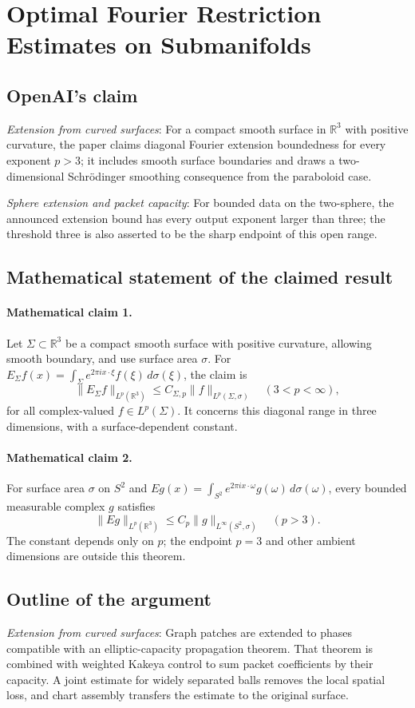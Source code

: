 \documentclass[11pt]{article}
\begin{document}
\section*{Optimal Fourier Restriction Estimates on Submanifolds}

\subsection{OpenAI's claim}
\textit{Extension from curved surfaces}: For a compact smooth surface in $\mathbb R^3$ with positive curvature, the paper claims diagonal Fourier extension boundedness for every exponent $p>3$; it includes smooth surface boundaries and draws a two-dimensional Schrödinger smoothing consequence from the paraboloid case.

\textit{Sphere extension and packet capacity}: For bounded data on the two-sphere, the announced extension bound has every output exponent larger than three; the threshold three is also asserted to be the sharp endpoint of this open range.

\subsection{Mathematical statement of the claimed result}
\paragraph{Mathematical claim 1.} Let $\Sigma\subset\mathbb R^3$ be a compact smooth surface with positive curvature, allowing smooth boundary, and use surface area $\sigma$. For $E_\Sigma f(x)=\int_\Sigma e^{2\pi ix\cdot\xi}f(\xi)\,d\sigma(\xi)$, the claim is \[\|E_\Sigma f\|_{L^p(\mathbb R^3)}\le C_{\Sigma,p}\|f\|_{L^p(\Sigma,\sigma)}\quad(3<p<\infty),\] for all complex-valued $f\in L^p(\Sigma)$. It concerns this diagonal range in three dimensions, with a surface-dependent constant.

\paragraph{Mathematical claim 2.} For surface area $\sigma$ on $S^2$ and $Eg(x)=\int_{S^2}e^{2\pi ix\cdot\omega}g(\omega)\,d\sigma(\omega)$, every bounded measurable complex $g$ satisfies \[\|Eg\|_{L^p(\mathbb R^3)}\le C_p\|g\|_{L^\infty(S^2,\sigma)}\quad(p>3).\] The constant depends only on $p$; the endpoint $p=3$ and other ambient dimensions are outside this theorem.

\subsection{Outline of the argument}
\textit{Extension from curved surfaces}: Graph patches are extended to phases compatible with an elliptic-capacity propagation theorem. That theorem is combined with weighted Kakeya control to sum packet coefficients by their capacity. A joint estimate for widely separated balls removes the local spatial loss, and chart assembly transfers the estimate to the original surface.
\end{document}
